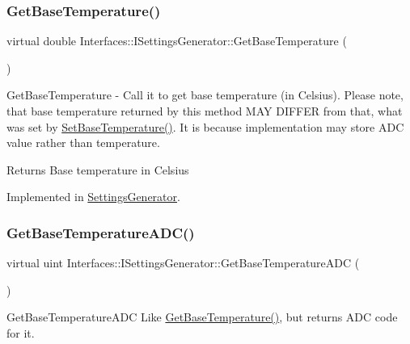 \subsubsection{\texorpdfstring{Get\+Base\+Temperature()}{GetBaseTemperature()}}
{\footnotesize\ttfamily virtual double Interfaces\+::\+I\+Settings\+Generator\+::\+Get\+Base\+Temperature (\begin{DoxyParamCaption}{ }\end{DoxyParamCaption})\hspace{0.3cm}{\ttfamily [pure virtual]}}



Get\+Base\+Temperature -\/ Call it to get base temperature (in Celsius). Please note, that base temperature returned by this method M\+AY D\+I\+F\+F\+ER from that, what was set by \hyperlink{class_interfaces_1_1_i_settings_generator_a8b60ba05790994db0303b251f655e95d}{Set\+Base\+Temperature()}. It is because implementation may store A\+DC value rather than temperature. 

\begin{DoxyReturn}{Returns}
Base temperature in Celsius 
\end{DoxyReturn}


Implemented in \hyperlink{class_settings_generator_a80b1ff8060a16d149989d98a88ab253e}{Settings\+Generator}.

\mbox{\label{class_interfaces_1_1_i_settings_generator_a1000ff41c6eecdb55a46c859ca0ebe67}} 
\subsubsection{\texorpdfstring{Get\+Base\+Temperature\+A\+D\+C()}{GetBaseTemperatureADC()}}
{\footnotesize\ttfamily virtual uint Interfaces\+::\+I\+Settings\+Generator\+::\+Get\+Base\+Temperature\+A\+DC (\begin{DoxyParamCaption}{ }\end{DoxyParamCaption})\hspace{0.3cm}{\ttfamily [pure virtual]}}



Get\+Base\+Temperature\+A\+DC Like \hyperlink{class_interfaces_1_1_i_settings_generator_a9cc36185b446f21e09a0e5633f39a1c5}{Get\+Base\+Temperature()}, but returns A\+DC code for it. 

